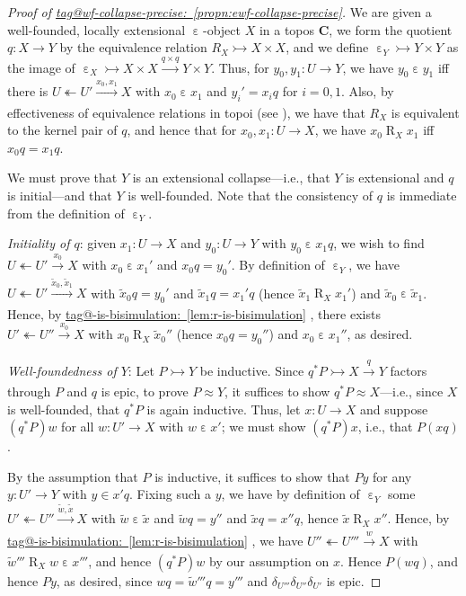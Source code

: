 \documentclass{amsart}
\makeatletter
\newcommand\bC{\mathbf{C}}
\newcommand\ein{\mathrel{\varepsilon}}
\newcommand\oot{\twoheadleftarrow}
\newcommand\Rrel{\mathrel{R}}
\newcommand\tox[2][]{\xrightarrow[#1]{#2}}
\newcommand\tto{\rightarrowtail}
\newcommand\unein{{\ein}}
\newcommand\tagword[1]{\csname tag@#1\endcsname}
\def\label@tag#1:#2\@nil{#1}
\newcommand\labeltag[1]{\label@tag#1:\@nil}
\newcommand\jref[1]{%
  \texorpdfstring%
    {\hyperref[#1]{\tagword{\labeltag{#1}}~\ref*{#1}}}%
    {\tagword{\labeltag{#1}}~\ref*{#1}}%
}
\theoremstyle{definition}
\theoremstyle{remark}
\theoremstyle{plainwithref}
\makeatother
\begin{document}
\begin{proof}[Proof of \jref{propn:ewf-collapse-precise}] \label{proof:ewf-collapse-precise}
We are given a well-founded, locally extensional \( \unein \)-object \( X \) in a topos \( \bC \), we form the quotient \( q \colon X \to Y \) by the equivalence relation \( R_X \tto X \times X \), and we define \( \unein_Y \tto Y \times Y \) as the image of \( \unein_X \tto X \times X \tox{q \times q} Y \times Y \).
Thus, for \( y_0,y_1 \colon U \to Y \), we have \( y_0 \ein y_1 \) iff there is \( U \oot U' \tox{x_0, x_1} X \) with \( x_0 \ein x_1 \) and \( y_i' = x_i q \) for \( i = 0,1 \).
Also, by effectiveness of equivalence relations in topoi (see \cite[Proposition~1.23]{johnstone-topos-theory}), we have that \( R_X \) is equivalent to the kernel pair of \( q \), and hence that for \( x_0, x_1 \colon U \to X \), we have \( x_0 \Rrel_X x_1 \) iff \( x_0 q = x_1 q \).

We must prove that \( Y \) is an extensional collapse---i.e., that \( Y \) is extensional and \( q \) is initial---and that \( Y \) is well-founded.
Note that the consistency of \( q \) is immediate from the definition of \( \unein_Y \).

\textit{Initiality of \( q \)}:
given \( x_1 \colon U \to X \) and \( y_0 \colon U \to Y \) with \( y_0 \ein x_1 q \), we wish to find \( U \oot U' \tox{x_0} X \) with \( x_0 \ein x_1' \) and \( x_0 q = y_0' \).
By definition of \( \unein_Y \), we have \( U \oot U' \tox{\tilde x_0, \tilde x_1} X \) with \( \tilde x_0 q = y_0' \) and \( \tilde x_1 q = x_1' q \) (hence \( \tilde x_1 \Rrel_X x_1' \)) and \( \tilde x_0 \ein \tilde x_1 \).
  Hence, by \jref{lem:r-is-bisimulation}, there exists \( U' \oot U'' \tox{x_0} X \) with \( x_0 \Rrel_X \tilde x_0'' \) (hence \( x_0 q = y_0'' \)) and \( x_0 \ein x_1'' \), as desired.

\textit{Well-foundedness of \( Y \)}:
Let \( P \tto Y \) be inductive.
  Since \( q^* P \tto X \tox{q} Y \) factors through \( P \) and \( q \) is epic, to prove \( P \approx Y \), it suffices to show \( q^* P \approx X \)---i.e., since \( X \) is well-founded, that \( q^* P \) is again inductive.
  Thus, let \( x \colon U \to X \) and suppose \( (q^* P) w \) for all \( w \colon U' \to X \) with \( w \ein x' \); we must show \( (q^* P) x \), i.e., that \( P (x q) \).

  By the assumption that \( P \) is inductive, it suffices to show that \( P y \) for any \( y \colon U' \to Y \) with \( y \in x' q \).
  Fixing such a \( y \), we have by definition of \( \unein_Y \) some \( U' \oot U'' \tox{\tilde w, \tilde x} X \) with \( \tilde w \ein \tilde x \) and \( \tilde w q = y'' \) and \( \tilde x q = x'' q \), hence \( \tilde x \Rrel_X x'' \).
  Hence, by \jref{lem:r-is-bisimulation}, we have \( U'' \oot U''' \tox{w} X \) with \( \tilde w''' \Rrel_X w \ein x''' \), and hence \( (q^* P) w \) by our assumption on \( x \).
  Hence \( P (w q) \), and hence \( P y \), as desired, since \( w q = \tilde w''' q = y''' \) and \( \delta_{U'''} \delta_{U''} \delta_{U'} \) is epic.


\end{proof}
\end{document}
